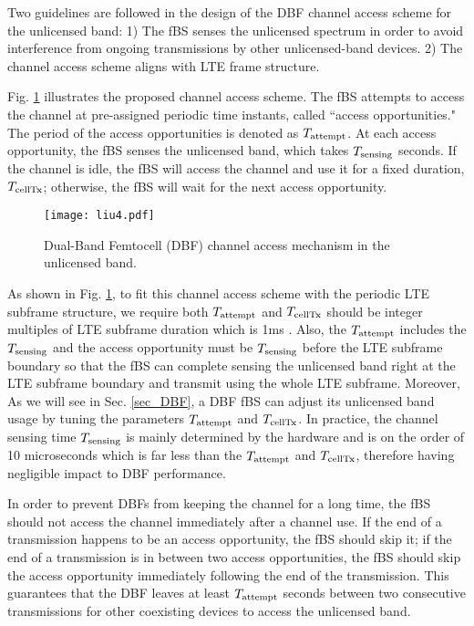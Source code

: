 \documentclass[journal,final,letterpaper,10pt,doublecolumn,twoside]{IEEEtran}
\begin{document}
Two guidelines are followed in the design of the DBF channel access scheme for the unlicensed band: 1) The fBS senses the unlicensed spectrum in order to avoid interference from ongoing transmissions by other unlicensed-band devices.  2) The channel access scheme aligns with LTE frame structure.

Fig. \ref{fig_channel_access} illustrates the proposed channel
access scheme. The fBS attempts to access the channel at
pre-assigned periodic time instants, called ``access opportunities."
The period of the access opportunities is denoted as
$T_{\textmd{attempt}}$. At each access opportunity,
the fBS senses the unlicensed band, which takes $T_\textmd{sensing}$ seconds.
If the channel is idle, the fBS
will access the channel and use it for a fixed duration,
$T_{\textmd{cellTx}}$; otherwise, the fBS will wait for the next
access opportunity.


\begin{figure}
  \center
  \texttt{[image: liu4.pdf]}
  \caption{Dual-Band Femtocell (DBF) channel access mechanism in the unlicensed band.} \label{fig_channel_access}
\end{figure}



As shown in Fig. \ref{fig_channel_access}, to fit this channel access scheme with the periodic LTE subframe structure, we require both $T_{\textmd{attempt}}$ and $T_{\textmd{cellTx}}$ should be integer multiples of LTE subframe duration which is 1ms \cite{LTE-A}. Also, the $T_{\textmd{attempt}}$ includes the $T_\textmd{sensing}$ and the access opportunity must be $T_\textmd{sensing}$ before the LTE subframe boundary so that the fBS
can complete sensing the unlicensed band right at the LTE subframe boundary and transmit using the whole LTE subframe.   Moreover,
As we will see in Sec. \ref{sec_DBF}, a DBF fBS
can adjust its unlicensed band usage by tuning the
parameters $T_{\textmd{attempt}}$ and $T_{\textmd{cellTx}}$.
In practice, the channel sensing time $T_\textmd{sensing}$  is mainly determined by the hardware and is on the order of
10 microseconds \cite{802.11-2007}  which is far less than the $T_{\textmd{attempt}}$ and $T_{\textmd{cellTx}}$, therefore having negligible impact to DBF performance.

In order to prevent DBFs from keeping the channel for a long time,
the fBS should not access the channel immediately after a channel
use. If the end of a transmission happens to be an access
opportunity, the fBS should skip it; if the end of a
transmission is in between two access opportunities, the fBS should skip
the access opportunity immediately following the end of the transmission. This guarantees that
the DBF leaves at least $T_{\textmd{attempt}}$ seconds between
two consecutive transmissions for other coexisting devices to access the
unlicensed band.
\end{document}
